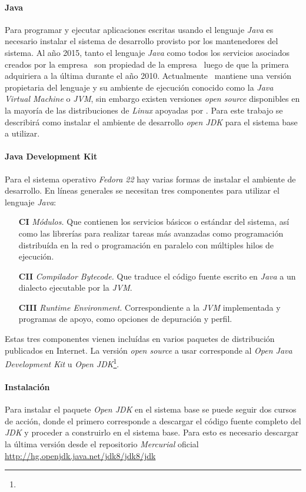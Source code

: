   \paragraph{Java}
  Para programar y ejecutar aplicaciones
  escritas usando el lenguaje \emph{Java}
  es necesario instalar el
  sistema de desarrollo provisto por 
  los mantenedores del sistema.
  Al año 2015,
  tanto el lenguaje \emph{Java}
  como todos los servicios asociados
  creados por la empresa
  \ssdSun\ son propiedad de
  la empresa \ssdOracle\ 
  luego de que la primera adquiriera a la última
  durante el año 2010.
  Actualmente
  \ssdOracle\ mantiene una versión propietaria
  del lenguaje y su ambiente de ejecución
  conocido como la \emph{Java Virtual Machine}
  o \emph{JVM},
  sin embargo existen versiones \emph{open source}
  disponibles en la mayoría de las distribuciones
  de \emph{Linux} apoyadas por \ssdOracle.
  Para este trabajo se describirá como instalar
  el ambiente de desarrollo 
  \emph{open JDK} para el sistema base a utilizar.

  \paragraph{Java Development Kit}
  Para el sistema operativo \emph{Fedora 22}
  hay varias formas de instalar el 
  ambiente de desarrollo.
  En líneas generales se necesitan
  tres componentes para utilizar el lenguaje
  \emph{Java}:
  \begin{itemize}
  \item[\textbf{CI}]
    \emph{Módulos.}
    Que contienen los servicios básicos
    o estándar del sistema,
    así como las librerías para
    realizar tareas más avanzadas
    como programación distribuída en la red
    o programación en paralelo con múltiples
    hilos de ejecución.
  \item[\textbf{CII}]
    \emph{Compilador Bytecode.}
    Que traduce el código fuente escrito
    en \emph{Java} a un dialecto
    ejecutable por la \emph{JVM}.
  \item[\textbf{CIII}]
    \emph{Runtime Environment.}
    Correspondiente a la \emph{JVM}
    implementada y programas de apoyo,
    como opciones de depuración y perfil.
  \end{itemize}
  Estas tres componentes vienen incluídas
  en varios paquetes de distribución publicados
  en Internet.
  La versión \emph{open source}
  a usar corresponde al 
  \emph{Open Java Development Kit}
  u \emph{Open JDK}\footnote{\ssdJDKLink}.
  
  \paragraph{Instalación}
  Para instalar el paquete 
  \emph{Open JDK}
  en el sistema base se puede seguir
  dos cursos de acción,
  donde el primero corresponde a descargar
  el código fuente completo
  del \emph{JDK}
  y proceder a construirlo en el sistema base.
  Para esto es necesario descargar la última versión
  desde el repositorio \emph{Mercurial} oficial 
  \url{http://hg.openjdk.java.net/jdk8/jdk8/jdk}
  

  